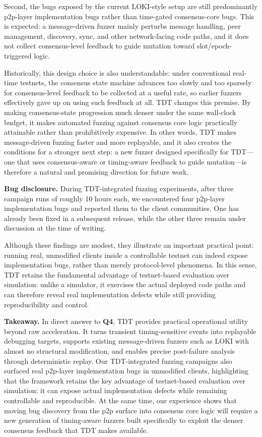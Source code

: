 Second, the bugs exposed by the current \textsc{LOKI}-style setup are still predominantly p2p-layer implementation bugs rather than time-gated consensus-core bugs. This is expected: a message-driven fuzzer mainly perturbs message handling, peer management, discovery, sync, and other network-facing code paths, and it does not collect consensus-level feedback to guide mutation toward slot/epoch-triggered logic. 

Historically, this design choice is also understandable: under conventional real-time testnets, the consensus state machine advances too slowly and too sparsely for consensus-level feedback to be collected at a useful rate, so earlier fuzzers effectively gave up on using such feedback at all. TDT changes this premise. By making consensus-state progression much denser under the same wall-clock budget, it makes automated fuzzing against consensus core logic practically attainable rather than prohibitively expensive. In other words, TDT makes message-driven fuzzing faster and more replayable, and it also creates the conditions for a stronger next step: a new fuzzer designed specifically for TDT---one that uses consensus-aware or timing-aware feedback to guide mutation---is therefore a natural and promising direction for future work.

\smallskip
\noindent\textbf{Bug disclosure.}
During TDT-integrated fuzzing experiments, after three campaign runs of roughly 10 hours each, we encountered four p2p-layer implementation bugs and reported them to the client communities. One has already been fixed in a subsequent release, while the other three remain under discussion at the time of writing.

Although these findings are modest, they illustrate an important practical point: running real, unmodified clients inside a controllable testnet can indeed expose implementation bugs, rather than merely protocol-level phenomena. In this sense, TDT retains the fundamental advantage of testnet-based evaluation over simulation: unlike a simulator, it exercises the actual deployed code paths and can therefore reveal real implementation defects while still providing reproducibility and control.

\smallskip
\noindent\textbf{Takeaway.}
In direct answer to \textbf{Q4}, TDT provides practical operational utility beyond raw acceleration. It turns transient timing-sensitive events into replayable debugging targets, supports existing message-driven fuzzers such as \textsc{LOKI} with almost no structural modification, and enables precise post-failure analysis through deterministic replay. Our TDT-integrated fuzzing campaigns also surfaced real p2p-layer implementation bugs in unmodified clients, highlighting that the framework retains the key advantage of testnet-based evaluation over simulation: it can expose actual implementation defects while remaining controllable and reproducible. At the same time, our experience shows that moving bug discovery from the p2p surface into consensus core logic will require a new generation of timing-aware fuzzers built specifically to exploit the denser consensus feedback that TDT makes available.


